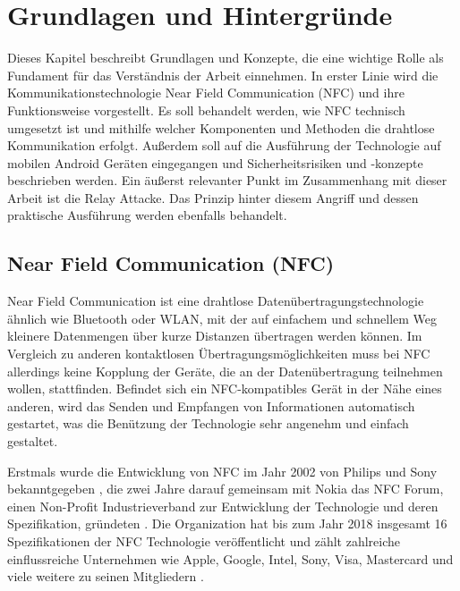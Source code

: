 \chapter{Grundlagen und Hintergründe}
\label{sec:fundamentals}

Dieses Kapitel beschreibt Grundlagen und Konzepte, die eine wichtige Rolle als Fundament für das Verständnis der Arbeit einnehmen. In erster Linie wird die Kommunikationstechnologie Near Field Communication (NFC) und ihre Funktionsweise vorgestellt. Es soll behandelt werden, wie NFC technisch umgesetzt ist und mithilfe welcher Komponenten und Methoden die drahtlose Kommunikation erfolgt. Außerdem soll auf die Ausführung der Technologie auf mobilen Android Geräten eingegangen und Sicherheitsrisiken und -konzepte beschrieben werden. Ein äußerst relevanter Punkt im Zusammenhang mit dieser Arbeit ist die Relay Attacke. Das Prinzip hinter diesem Angriff und dessen praktische Ausführung werden ebenfalls behandelt. 

\section{Near Field Communication (NFC)}

Near Field Communication ist eine drahtlose Datenübertragungstechnologie ähnlich wie Bluetooth oder WLAN, mit der auf einfachem und schnellem Weg kleinere Datenmengen 
über kurze Distanzen übertragen werden können. Im Vergleich zu anderen kontaktlosen Übertragungsmöglichkeiten muss bei NFC allerdings keine Kopplung der Geräte, die an der Datenübertragung teilnehmen wollen, stattfinden. Befindet sich ein NFC-kompatibles Gerät in der Nähe eines anderen, wird das Senden und Empfangen von Informationen automatisch
gestartet, was die Benützung der Technologie sehr angenehm und einfach gestaltet. 

Erstmals wurde die Entwicklung von NFC im Jahr 2002 von Philips und Sony bekanntgegeben \cite{sonyPhillipsNfcPressRelease}, die zwei Jahre darauf gemeinsam mit Nokia das NFC Forum, einen Non-Profit Industrieverband zur Entwicklung der Technologie und deren Spezifikation, gründeten \cite{nfcHistory, nfcForum}. Die Organization hat bis zum Jahr 2018 insgesamt 16 Spezifikationen der NFC Technologie veröffentlicht und zählt zahlreiche einflussreiche Unternehmen wie Apple, Google, Intel, Sony, Visa, Mastercard und viele weitere zu seinen Mitgliedern \cite{nfcForum}. 

